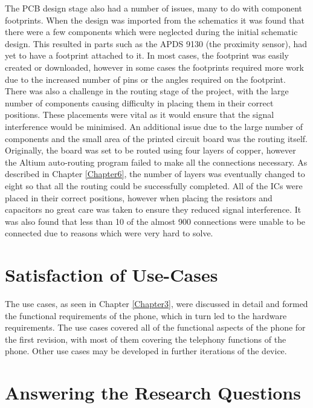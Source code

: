	The PCB design stage also had a number of issues, many to do with component footprints. 
When the design was imported from the schematics it was found that there were a few components which were neglected during the initial schematic design. This resulted in parts such as the APDS 9130 (the proximity sensor), had yet to have a footprint attached to it. 
In most cases, the footprint was easily created or downloaded, however in some cases the footprints required more work due to the increased number of pins or the angles required on the footprint. 
There was also a challenge in the routing stage of the project, with the large number of components causing difficulty in placing them in their correct positions. These placements were vital as it would ensure that the signal interference would be minimised. 
An additional issue due to the large number of components and the small area of the printed circuit board was the routing itself. 
Originally, the board was set to be routed using four layers of copper, however the Altium auto-routing program failed to make all the connections necessary.
As described in Chapter \ref{Chapter6}, the number of layers was eventually changed to eight so that all the routing could be successfully completed. 
All of the ICs were placed in their correct positions, however when placing the resistors and capacitors no great care was taken to ensure they reduced signal interference. 
It was also found that less than 10 of the almost 900 connections were unable to be connected due to reasons which were very hard to solve.\\


\section{Satisfaction of Use-Cases}
\label{chap7sec2}

	The use cases, as seen in Chapter \ref{Chapter3}, were discussed in detail and formed the functional requirements of the phone, which in turn led to the hardware requirements. 
The use cases covered all of the functional aspects of the phone for the first revision, with most of them covering the telephony functions of the phone.
Other use cases may be developed in further iterations of the device. 

\section{Answering the Research Questions}
\label{chap7sec3}

